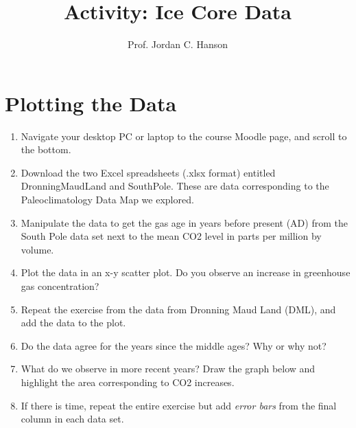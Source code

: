 \documentclass{article}
\begin{document}
\title{Activity: Ice Core Data}
\author{Prof. Jordan C. Hanson}

\maketitle

\section{Plotting the Data}

\begin{enumerate}
\item Navigate your desktop PC or laptop to the course Moodle page, and scroll to the bottom.
\item Download the two Excel spreadsheets (.xlsx format) entitled DronningMaudLand and SouthPole.  These are data corresponding to the Paleoclimatology Data Map we explored.
\item Manipulate the data to get the gas age in years before present (AD) from the South Pole data set next to the mean CO2 level in parts per million by volume.
\item Plot the data in an x-y scatter plot.  Do you observe an increase in greenhouse gas concentration?
\item Repeat the exercise from the data from Dronning Maud Land (DML), and add the data to the plot.
\item Do the data agree for the years since the middle ages? Why or why not?
\item What do we observe in more recent years?  Draw the graph below and highlight the area corresponding to CO2 increases. \\ \vspace{4cm}
\item If there is time, repeat the entire exercise but add \textit{error bars} from the final column in each data set.
\end{enumerate}
\end{document}
